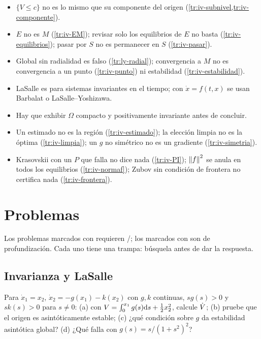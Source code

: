 \begin{trampa}[title={\faBug\hspace{0.45em}Las trampas del capítulo, en una caja}]{}
\begin{itemize}
  \item $\{V\le c\}$ no es lo mismo que su componente del origen (\cref{tr:iv-subnivel,tr:iv-componente}).
  \item $E$ no es $M$ (\cref{tr:iv-EM}); revisar solo los equilibrios de $E$ no basta (\cref{tr:iv-equilibrios}); pasar por $S$ no es permanecer en $S$ (\cref{tr:iv-pasar}).
  \item Global sin radialidad es falso (\cref{tr:ly-radial}); convergencia a $M$ no es convergencia a un punto (\cref{tr:iv-punto}) ni estabilidad (\cref{tr:iv-estabilidad}).
  \item LaSalle es para sistemas invariantes en el tiempo; con $\dot x=f(t,x)$ se usan Barbalat o LaSalle--Yoshizawa.
  \item Hay que exhibir $\Omega$ compacto y positivamente invariante antes de concluir.
  \item Un estimado no es la región (\cref{tr:iv-estimado}); la elección limpia no es la óptima (\cref{tr:iv-limpia}); un $g$ no simétrico no es un gradiente (\cref{tr:iv-simetria}).
  \item Krasovskii con un $P$ que falla no dice nada (\cref{tr:iv-PI}); $\left\lVert f\right\rVert^2$ se anula en todos los equilibrios (\cref{tr:iv-normaf}); Zubov sin condición de frontera no certifica nada (\cref{tr:iv-frontera}).
\end{itemize}
\end{trampa}

\section{Problemas}
\label{sec:iv-problemas}

Los problemas marcados con \etiquetaM{} requieren \matlab/\simulink; los marcados con \etiquetaEstrella{} son de profundización. Cada uno tiene una trampa: búsquela antes de dar la respuesta.

\subsection*{Invarianza y LaSalle}

\begin{problema}\label{prob:iv-lienard}
Para $\dot x_1=x_2$, $\dot x_2=-g(x_1)-k(x_2)$ con $g,k$ continuas, $sg(s)>0$ y $sk(s)>0$ para $s\neq0$: (a) con $V=\int_0^{x_1}g(s)\mathrm{d} s+\tfrac12x_2^2$, calcule $\dot V$; (b) pruebe que el origen es asintóticamente estable; (c) ¿qué condición sobre $g$ da estabilidad asintótica global? (d) ¿Qué falla con $g(s)=s/(1+s^2)^2$?
\end{problema}

